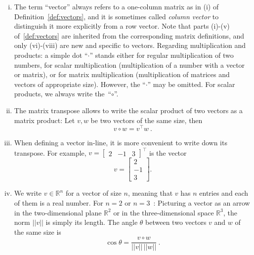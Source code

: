 \begin{remark}
\label{rem:vectors}
\begin{enumerate}[(i)]
	\item The term ``vector'' always refers to a one-column matrix as in (i) of Definition~\ref{def:vectors}, and it is sometimes called \emph{column vector} to distinguish it more explicitly from a row vector. Note that parts (i)-(v) of~\ref{def:vectors} are inherited from the corresponding matrix definitions, and only (vi)-(viii) are new and specific to vectors. Regarding multiplication and products: a simple dot ``$\cdot$'' stands either for regular multiplication of two numbers, for scalar multiplication (multiplication of a number with a vector or matrix), or for matrix multiplication (multiplication of matrices and vectors of appropriate size). However, the ``$\cdot$'' may be omitted. For scalar products, we always write the~``$\circ$''.
	\item The matrix transpose allows to write the scalar product of two vectors as a matrix product: Let $v,w$ be two vectors of the same size, then
	\[ v \circ w = v^\top w \:. \]
	\item When defining a vector in-line, it is more convenient to write down its transpose. For example, $v = \begin{bmatrix} 2 & -1 & 3 \end{bmatrix}^\top$ is the vector
	\[ v = \begin{bmatrix} 2 \\ -1 \\ 3 \end{bmatrix}. \]
	\item We write $v\in\mathbb{R}^n$ for a vector of size $n$, meaning that $v$ has $n$ entries and each of them is a real number. For $n=2$ or $n=3$~: Picturing a vector as an arrow in the two-dimensional plane $\mathbb{R}^2$ or in the three-dimensional space $\mathbb{R}^3$, the norm $||v||$ is simply its length. The angle $\theta$ between two vectors $v$ and $w$ of the same size is
	\[ \cos \theta = \frac{v \circ w}{||v|| \, ||w||} \:. \]
	\end{enumerate}
\end{remark}


